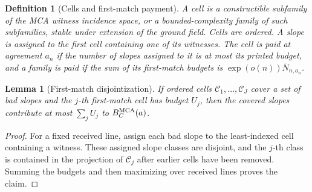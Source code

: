 \documentclass[11pt,a4paper]{amsart}
\numberwithin{equation}{section}
\newtheorem{lemma}[theorem]{Lemma}
\newtheorem{definition}[theorem]{Definition}
\theoremstyle{remark}
\newcommand{\Ccal}{\mathcal C}
\newcommand{\barN}{\overline N}
\begin{document}
\begin{definition}[Cells and first-match payment]\label{def:cells}
A \emph{cell} is a constructible subfamily of the MCA witness incidence space, or a bounded-complexity family of such subfamilies, stable under extension of the ground field.  Cells are ordered.  A slope is assigned to the first cell containing one of its witnesses.  The cell is \emph{paid} at agreement \(a_n\) if the number of slopes assigned to it is at most its printed budget, and a family is paid if the sum of its first-match budgets is \(\exp(o(n))\barN_{n,a_n}\).
\end{definition}

\begin{lemma}[First-match disjointization]\label{lem:first-match}
If ordered cells \(\Ccal_1,\ldots,\Ccal_J\) cover a set of bad slopes and the \(j\)-th first-match cell has budget \(U_j\), then the covered slopes contribute at most \(\sum_jU_j\) to \(B_C^{\rm MCA}(a)\).
\end{lemma}

\begin{proof}
For a fixed received line, assign each bad slope to the least-indexed cell containing a witness.  These assigned slope classes are disjoint, and the \(j\)-th class is contained in the projection of \(\Ccal_j\) after earlier cells have been removed.  Summing the budgets and then maximizing over received lines proves the claim.
\end{proof}
\end{document}
